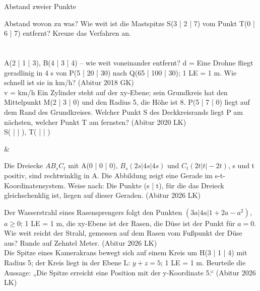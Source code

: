 \begin{aufgabe}{Abstand zweier Punkte}
\begin{teile}
\teil Abstand wovon zu was? Wie weit ist die Mastspitze S(3 | 2 | 7) vom Punkt T(0 | 6 | 7) entfernt? Kreuze das Verfahren an. \\  \\  \\ 
\teil A(2 | 1 | 3), B(4 | 3 | 4) – wie weit voneinander entfernt? d = \leerfeld
\teil Eine Drohne fliegt geradlinig in 4 s von P(5 | 20 | 30) nach Q(65 | 100 | 30); 1 LE = 1 m. Wie schnell ist sie in km/h? \hfill (Abitur 2018 GK) \\ v = \leerfeld km/h
\teil Ein Zylinder steht auf der xy-Ebene; sein Grundkreis hat den Mittelpunkt M(2 | 3 | 0) und den Radius 5, die Höhe ist 8. P(5 | 7 | 0) liegt auf dem Rand des Grundkreises. Welcher Punkt S des Deckkreisrands liegt P am nächsten, welcher Punkt T am fernsten? \hfill (Abitur 2020 LK) \\ S( \leerfeld | \leerfeld | \leerfeld ), T( \leerfeld | \leerfeld | \leerfeld )
\end{teile}
\begin{gleichungsraster}[2]
 &
\end{gleichungsraster}
\begin{teile}
\teil Die Dreiecke $AB_sC_t$ mit A(0 | 0 | 0), $B_s(2s | 4s | 4s)$ und $C_t(2t | t | -2t)$, s und t positiv, sind rechtwinklig in A. Die Abbildung zeigt eine Gerade im s-t-Koordinatensystem. Weise nach: Die Punkte (s | t), für die das Dreieck gleichschenklig ist, liegen auf dieser Geraden. \hfill (Abitur 2026 LK)

\begin{ksys}[xmin=0,xmax=4,ymin=0,ymax=8,xlabel=s,ylabel=t,ablesen]
\end{ksys}
\teil Der Wasserstrahl eines Rasensprengers folgt den Punkten $(3a | 4a | 1 + 2a - a^2)$, $a \ge 0$; 1 LE = 1 m, die xy-Ebene ist der Rasen, die Düse ist der Punkt für $a = 0$. Wie weit reicht der Strahl, gemessen auf dem Rasen vom Fußpunkt der Düse aus? Runde auf Zehntel Meter. \hfill (Abitur 2026 LK) \\ \leerfeld[m]
\teil Die Spitze eines Kamerakrans bewegt sich auf einem Kreis um H(3 | 1 | 4) mit Radius 5; der Kreis liegt in der Ebene L: $y + z = 5$; 1 LE = 1 m. Beurteile die Aussage: „Die Spitze erreicht eine Position mit der y-Koordinate 5.“ \hfill (Abitur 2026 LK)
\end{teile}
\end{aufgabe}

